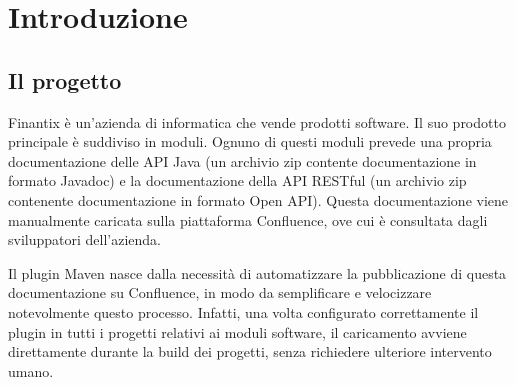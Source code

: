 
\chapter{Introduzione}
\label{cap:introduzione}





\section{Il progetto}   \label{secProgetto}
Finantix è un'azienda di informatica che vende prodotti software.
Il suo prodotto principale è suddiviso in moduli.
Ognuno di questi moduli prevede una propria documentazione delle API Java (un archivio zip contente documentazione in formato Javadoc) e la documentazione della API RESTful (un archivio zip contenente documentazione in formato Open API).
Questa documentazione viene manualmente caricata sulla piattaforma Confluence, ove cui è consultata dagli sviluppatori dell'azienda.

Il plugin Maven nasce dalla necessità di automatizzare la pubblicazione di questa documentazione su Confluence, in modo da semplificare e velocizzare notevolmente questo processo.
Infatti, una volta configurato correttamente il plugin in tutti i progetti relativi ai moduli software, il caricamento avviene direttamente durante la build dei progetti, senza richiedere ulteriore intervento umano.

    
